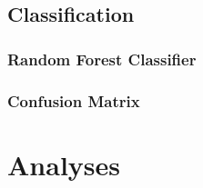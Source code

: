 \documentclass{article}
\begin{document}
	\subsection{Classification}
		\subsubsection{Random Forest Classifier}
		\subsubsection{Confusion Matrix}
		\subsubsection{}
		
	\subsection{}

\section{Analyses}
\subsection{}


 
\end{document}
